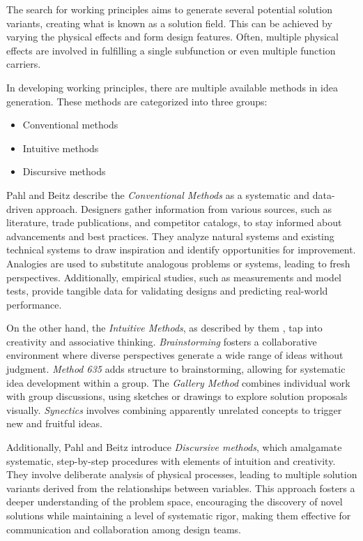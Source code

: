 The search for working principles aims to generate several potential solution variants, creating what is known as a solution field. This can be achieved by varying the physical effects and form design features. Often, multiple physical effects are involved in fulfilling a single subfunction or even multiple function carriers. \cite{Pahl07f}

In developing working principles, there are multiple available methods in idea generation. These methods are categorized into three groups:

\begin{itemize}
    \item Conventional methods
    \item Intuitive methods
    \item Discursive methods
\end{itemize}

Pahl and Beitz \cite{Pahl07g} describe the \textit{Conventional Methods} as a systematic and data-driven approach. Designers gather information from various sources, such as literature, trade publications, and competitor catalogs, to stay informed about advancements and best practices. They analyze natural systems and existing technical systems to draw inspiration and identify opportunities for improvement. Analogies are used to substitute analogous problems or systems, leading to fresh perspectives. Additionally, empirical studies, such as measurements and model tests, provide tangible data for validating designs and predicting real-world performance.

On the other hand, the \textit{Intuitive Methods}, as described by them \cite{Pahl07h}, tap into creativity and associative thinking. \textit{Brainstorming} fosters a collaborative environment where diverse perspectives generate a wide range of ideas without judgment. \textit{Method 635} adds structure to brainstorming, allowing for systematic idea development within a group. The \textit{Gallery Method} combines individual work with group discussions, using sketches or drawings to explore solution proposals visually. \textit{Synectics} involves combining apparently unrelated concepts to trigger new and fruitful ideas.

Additionally, Pahl and Beitz \cite{Pahl07i} introduce \textit{Discursive methods}, which amalgamate systematic, step-by-step procedures with elements of intuition and creativity. They involve deliberate analysis of physical processes, leading to multiple solution variants derived from the relationships between variables. This approach fosters a deeper understanding of the problem space, encouraging the discovery of novel solutions while maintaining a level of systematic rigor, making them effective for communication and collaboration among design teams.

